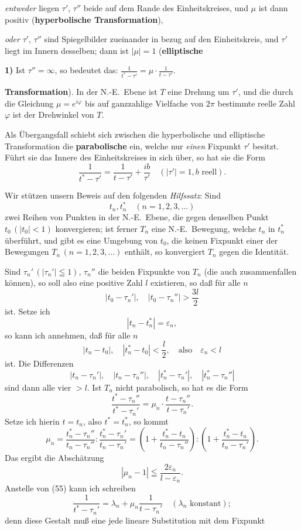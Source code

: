 \documentclass{article}
\begin{document}
\emph{entweder} liegen $\tau'$, $\tau''$ beide auf dem Rande des Einheitskreises, und $\mu$ ist dann positiv (\textbf{hyperbolische Transformation}),

\emph{oder} $\tau'$, $\tau''$ sind Spiegelbilder zueinander in bezug auf den Einheitskreis, und $\tau'$ liegt im Innern desselben; dann ist $|\mu| = 1$ (\textbf{elliptische}

\textbf{1)} Ist $\tau'' = \infty$, so bedeutet das: $\displaystyle\frac{1}{t^* - \tau'} = \mu \cdot \frac{1}{t - \tau'}$.

\textbf{Transformation}). In der N.-E.\ Ebene ist $T$ eine Drehung um $\tau'$, und die durch die Gleichung $\mu = e^{i\varphi}$ bis auf ganzzahlige Vielfache von $2\pi$ bestimmte reelle Zahl $\varphi$ ist der Drehwinkel von $T$.

Als Übergangsfall schiebt sich zwischen die hyperbolische und elliptische Transformation die \textbf{parabolische} ein, welche nur \emph{einen} Fixpunkt $\tau'$ besitzt. Führt sie das Innere des Einheitskreises in sich über, so hat sie die Form
\[ \frac{1}{t^* - \tau'} = \frac{1}{t - \tau'} + \frac{ib}{\tau'} \quad (|\tau'| = 1, b \text{ reell}). \tag{54} \]

Wir stützen unsern Beweis auf den folgenden \emph{Hilfssatz}: Sind
\[ t_n, t_n^* \quad (n = 1, 2, 3, \dots) \]
zwei Reihen von Punkten in der N.-E.\ Ebene, die gegen denselben Punkt $t_0\,(|t_0| < 1)$ konvergieren; ist ferner $T_n$ eine N.-E.\ Bewegung, welche $t_n$ in $t_n^*$ überführt, und gibt es eine Umgebung von $t_0$, die keinen Fixpunkt einer der Bewegungen $T_n\,(n = 1, 2, 3, \dots)$ enthält, so konvergiert $T_n$ gegen die Identität.

Sind $\tau_n'\,(|\tau_n'| \leqq 1)$, $\tau_n''$ die beiden Fixpunkte von $T_n$ (die auch zusammenfallen können), so soll also eine positive Zahl $l$ existieren, so daß für alle $n$
\[ |t_0 - \tau_n'|, \quad |t_0 - \tau_n''| > \frac{3l}{2} \]
ist. Setze ich
\[ |t_n - t_n^*| = \varepsilon_n, \]
so kann ich annehmen, daß für alle $n$
\[ |t_n - t_0|, \quad |t_n^* - t_0| < \frac{l}{2}, \quad \text{also} \quad \varepsilon_n < l \]
ist. Die Differenzen
\[ |t_n - \tau_n'|, \quad |t_n - \tau_n''|, \quad |t_n^* - \tau_n'|, \quad |t_n^* - \tau_n''| \]
sind dann alle vier $> l$. Ist $T_n$ nicht parabolisch, so hat es die Form
\[ \frac{t^* - \tau_n''}{t^* - \tau_n'} = \mu_n \cdot \frac{t - \tau_n''}{t - \tau_n'}. \tag{55} \]
Setze ich hierin $t = t_n$, also $t^* = t_n^*$, so kommt
\[ \mu_n = \frac{t_n^* - \tau_n''}{t_n - \tau_n''} : \frac{t_n^* - \tau_n'}{t_n - \tau_n'} = \left( 1 + \frac{t_n^* - t_n}{t_n - \tau_n''} \right) : \left( 1 + \frac{t_n^* - t_n}{t_n - \tau_n'} \right). \]
Das ergibt die Abschätzung
\[ |\mu_n - 1| \leqq \frac{2\varepsilon_n}{l - \varepsilon_n}. \tag{56} \]
Anstelle von (55) kann ich schreiben
\[ \frac{1}{t^* - \tau_n'} = \lambda_n + \mu_n \frac{1}{t - \tau_n'} \quad (\lambda_n \text{ konstant}); \tag{57} \]
denn diese Gestalt muß eine jede lineare Substitution mit dem Fixpunkt
\end{document}
